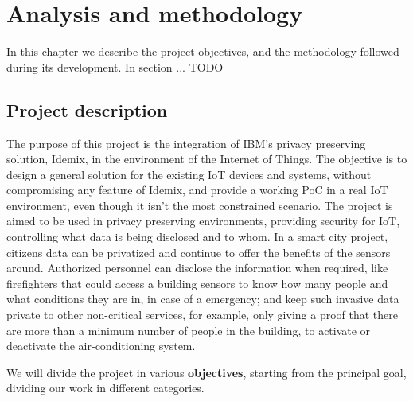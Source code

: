 \chapter{Analysis and methodology}\label{ch:objectives}





In this chapter we describe the project objectives, and the methodology followed during its development. In section ... TODO

\section{Project description}

The purpose of this project is the integration of IBM's privacy preserving solution, Idemix, in the environment of the Internet of Things. The objective is to design a general solution for the existing IoT devices and systems, without compromising any feature of Idemix, and provide a working PoC in a real IoT environment, even though it isn't the most constrained scenario. The project is aimed to be used in privacy preserving environments, providing security for IoT, controlling what data is being disclosed and to whom. In a smart city project, citizens data can be privatized and continue to offer the benefits of the sensors around. Authorized personnel can disclose the information when required, like firefighters that could access a building sensors to know how many people and what conditions they are in, in case of a emergency; and keep such invasive data private to other non-critical services, for example, only giving a proof that there are more than a minimum number of people in the building, to activate or deactivate the air-conditioning system.

\hfil

We will divide the project in various \textbf{objectives}, starting from the principal goal, dividing our work in different categories.

\hfil

